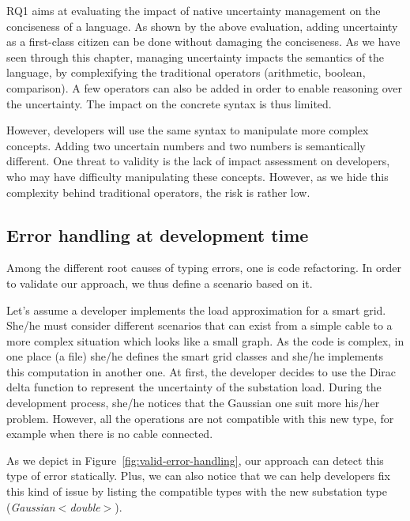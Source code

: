 RQ1 aims at evaluating the impact of native uncertainty management on the conciseness of a language.
As shown by the above evaluation, adding uncertainty as a first-class citizen can be done without damaging the conciseness.
As we have seen through this chapter, managing uncertainty impacts the semantics of the language, by complexifying the traditional operators (arithmetic, boolean, comparison).
A few operators can also be added in order to enable reasoning over the uncertainty.
The impact on the concrete syntax is thus limited.

However, developers will use the same syntax to manipulate more complex concepts.
Adding two uncertain numbers and two numbers is semantically different.
One threat to validity is the lack of impact assessment on developers, who may have difficulty manipulating these concepts.
However, as we hide this complexity behind traditional operators, the risk is rather low.


\subsection{Error handling at development time}
Among the different root causes of typing errors, one is code refactoring.
In order to validate our approach, we thus define a scenario based on it.

Let's assume a developer implements the load approximation for a smart grid.
She/he must consider different scenarios that can exist from a simple cable to a more complex situation which looks like a small graph.
As the code is complex, in one place (\eg a file) she/he defines the smart grid classes and she/he implements this computation in another one.
At first, the developer decides to use the Dirac delta function to represent the uncertainty of the substation load.
During the development process, she/he notices that the Gaussian one suit more his/her problem.
However, all the operations are not compatible with this new type, for example when there is no cable connected.

As we depict in Figure~\ref{fig:valid-error-handling}, our approach can detect this type of error statically.
Plus, we can also notice that we can help developers fix this kind of issue by listing the compatible types with the new substation type (\textit{Gaussian$<$double$>$}).

